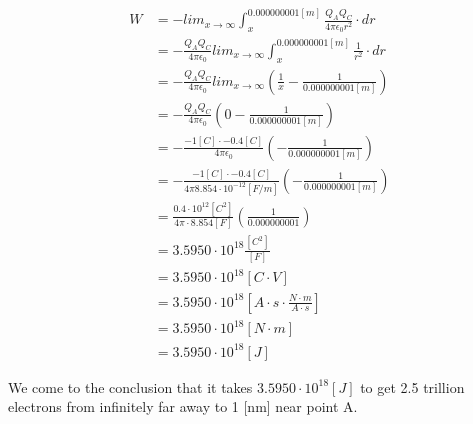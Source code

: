 \documentclass[paper=a4, fontsize=11pt]{scrartcl} %
\numberwithin{equation}{section} %
\numberwithin{figure}{section} %
\numberwithin{table}{section} %
\begin{document}
\begin{align} \label{eq:4}
W &= - lim_{x\to\infty} \int_x^{0.000000001[m]}{\frac{Q_A Q_C}{4 \pi \epsilon_0 r^2}} \cdot dr \\
  &= - \frac{Q_A Q_C}{4 \pi \epsilon_0 } lim_{x\to\infty} \int_x^{0.000000001[m]}{\frac{1}{r^2}} \cdot dr \\
  &= - \frac{Q_A Q_C}{4 \pi \epsilon_0 } lim_{x\to\infty} \left( \frac{1}{x} - \frac{1}{0.000000001[m]} \right) \\
  &= - \frac{Q_A Q_C}{4 \pi \epsilon_0 } \left( 0 - \frac{1}{0.000000001[m]} \right) \\
  &= - \frac{-1[C] \cdot -0.4[C]}{4 \pi \epsilon_0 } \left( - \frac{1}{0.000000001[m]} \right) \\
  &= - \frac{-1[C] \cdot -0.4[C]}{4 \pi 8.854 \cdot 10 ^ {-12} [F/m] } \left( - \frac{1}{0.000000001[m]} \right) \\
  &= \frac{0.4 \cdot 10 ^ {12} [C^2]}{4 \pi \cdot 8.854 [F]} \left( \frac{1}{0.000000001} \right) \\
  &= 3.5950 \cdot 10^{18} \frac{[C^2]}{[F]} \\
  &= 3.5950 \cdot 10^{18} [C \cdot V] \\
  &= 3.5950 \cdot 10^{18} \left[A \cdot s \cdot \frac{N \cdot m}{A \cdot s}\right] \\
  &= 3.5950 \cdot 10^{18} [N \cdot m] \\
  &= 3.5950 \cdot 10^{18} [J]
\end{align}

We come to the conclusion that it takes $3.5950 \cdot 10^{18} [J]$ to get 2.5 trillion electrons from infinitely far away
to 1 [nm] near point A.


\end{document}
